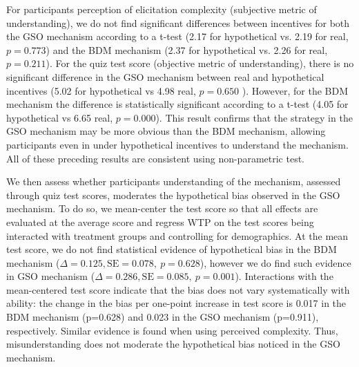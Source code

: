 \documentclass[12pt]{article}
\begin{document}
For participants perception of elicitation complexity (subjective metric of understanding), we do not find significant differences between incentives for both the GSO mechanism according to a t-test (2.17 for hypothetical vs. 2.19 for real, \(p =0.773\)) and the BDM mechanism (2.37 for hypothetical vs. 2.26 for real, \(p =0.211\)). For the quiz test score (objective metric of understanding), there is no significant difference in the GSO mechanism  between real and hypothetical incentives (5.02 for hypothetical vs 4.98 real, \(p =0.650\) ). However,  for the BDM mechanism the difference is statistically significant according to a t-test (4.05 for hypothetical vs 6.65 real, \(p=0.000\)). This result confirms that the strategy in the GSO mechanism may be more obvious than the BDM mechanism, allowing participants even in under hypothetical incentives to understand the mechanism. All of these preceding results are consistent using non-parametric test.

We then assess whether participants understanding of the mechanism, assessed through quiz test scores, moderates the hypothetical bias observed in the GSO mechanism. To do so, we mean-center the test score so that all effects are evaluated at the average score and regress WTP on the test scores being interacted with treatment groups and controlling for demographics. At the mean test score, we do not find statistical evidence of hypothetical bias in the BDM mechanism (\(\Delta = 0.125, \text{SE} = 0.078,\ p = 0.628\)), however we do find such evidence in GSO mechanism (\(\Delta = 0.286, \text{SE} = 0.085,\ p = 0.001\)).  Interactions with the mean-centered test score indicate that the bias does not vary systematically with ability: the change in the bias per one-point increase in test score is 0.017 in the BDM mechanism (p=0.628) and 0.023 in the GSO mechanism (p=0.911), respectively. Similar evidence is found when using perceived complexity.
Thus, misunderstanding does not moderate the hypothetical bias noticed in the GSO mechanism. 
\end{document}
